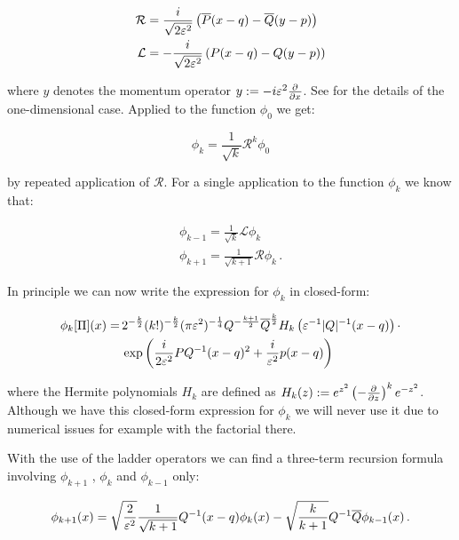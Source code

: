 \begin{align} \label{eq:raising_ops_1d}
  \mathcal{R} & =  \frac{i}{\sqrt{2\varepsilon^2}} \left( \overline{P} (x-q) - \overline{Q} (y-p) \right) \\
  \mathcal{L} & = -\frac{i}{\sqrt{2\varepsilon^2}} \left( P (x-q) - Q (y-p) \right)
\end{align}

where $y$ denotes the momentum operator $y := -i\varepsilon^2 \frac{\partial^{}}{\partial x^{}}$.
See \cite{B_bachelor_thesis} for the details of the one-dimensional case.
Applied to the function $\phi_0$ we get:

\begin{equation}
  \phi_k = \frac{1}{\sqrt{k}} \mathcal{R}^k \phi_0
\end{equation}

by repeated application of $\mathcal{R}$. For a single application to the function
$\phi_k$ we know that:

\begin{align}
  \phi_{k-1} = \frac{1}{\sqrt{k}} \mathcal{L} \phi_k \\
  \phi_{k+1} = \frac{1}{\sqrt{k+1}} \mathcal{R} \phi_k \,.
\end{align}

In principle we can now write the expression for $\phi_k$ in closed-form:

\begin{align*}
  \phi_k[\Pi](x) = \, & 2^{-\frac{k}{2}} (k!)^{-\frac{k}{2}} (\pi\varepsilon^2)^{-\frac{1}{4}}
                     Q^{-\frac{k+1}{2}} \overline{Q}^{\frac{k}{2}}
                     H_k \left(\varepsilon^{-1} |Q|^{-1} (x-q) \right) \cdot \\
                   & \exp \left( \frac{i}{2\varepsilon^2} PQ{}^{-1} (x-q)^2 + \frac{i}{\varepsilon^2} p (x-q) \right)
\end{align*}

where the Hermite polynomials $H_k$ are defined as $H_k(z) := e^{z^2} \left(-\frac{\partial^{}}{\partial z^{}} \right)^k e^{-z^2}$.
Although we have this closed-form expression for $\phi_k$ we will never use it
due to numerical issues for example with the factorial there.

With the use of the ladder operators we can find a three-term recursion formula
involving $\phi_{k+1}$ , $\phi_k$ and $\phi_{k-1}$ only:

\begin{equation}
  \phi_{k+1}(x) = \sqrt{\frac{2}{\varepsilon^2}} \frac{1}{\sqrt{k+1}} Q^{-1} (x-q) \phi_k(x)
                  -\sqrt{\frac{k}{k+1}} Q^{-1} \overline{Q} \phi_{k-1}(x) \,.
\end{equation}

